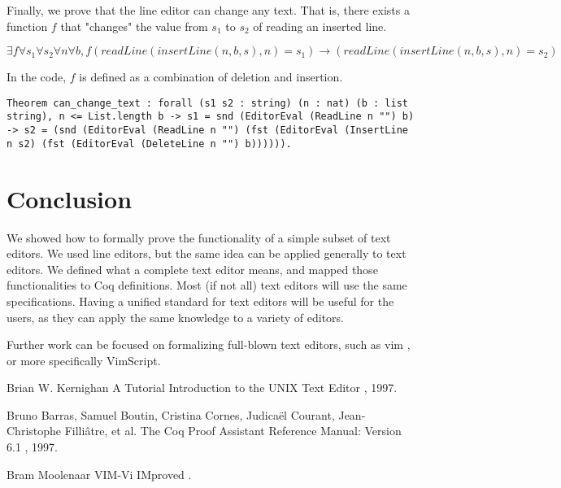 \documentclass{article}
\theoremstyle{definition}
\begin{document}
Finally, we prove that the line editor can change any text. That is, there exists a function \(f\) that "changes" the value from \(s_1\) to \(s_2\) of reading an inserted line.

\begin{center}
\(\exists f \forall s_1 \forall s_2 \forall n \forall b, f(readLine(insertLine( n, b, s ), n) = s_1) \to (readLine(insertLine( n, b, s ), n) = s_2)\)
\end{center}

In the code, \(f\) is defined as a combination of deletion and insertion.

\begin{lstlisting}
Theorem can_change_text : forall (s1 s2 : string) (n : nat) (b : list string), n <= List.length b -> s1 = snd (EditorEval (ReadLine n "") b) -> s2 = (snd (EditorEval (ReadLine n "") (fst (EditorEval (InsertLine n s2) (fst (EditorEval (DeleteLine n "") b)))))).
\end{lstlisting}

\section{Conclusion}
We showed how to formally prove the functionality of a simple subset of text editors. We used line editors, but the same idea can be applied generally to text editors. We defined what a complete text editor means, and mapped those functionalities to Coq definitions. Most (if not all) text editors will use the same specifications. Having a unified standard for text editors will be useful for the users, as they can apply the same knowledge to a variety of editors.

Further work can be focused on formalizing full-blown text editors, such as vim \cite{b3}, or more specifically VimScript.

\begin{thebibliography}{1}

Brian W. Kernighan
\newblock A Tutorial Introduction to the UNIX Text Editor
, 1997.

Bruno Barras, Samuel Boutin, Cristina Cornes, Judicaël Courant, Jean-Christophe Filliâtre, et al.
\newblock The Coq Proof Assistant Reference Manual: Version 6.1
, 1997.

Bram Moolenaar
\newblock VIM-Vi IMproved
.

\end{thebibliography}
\end{document}
